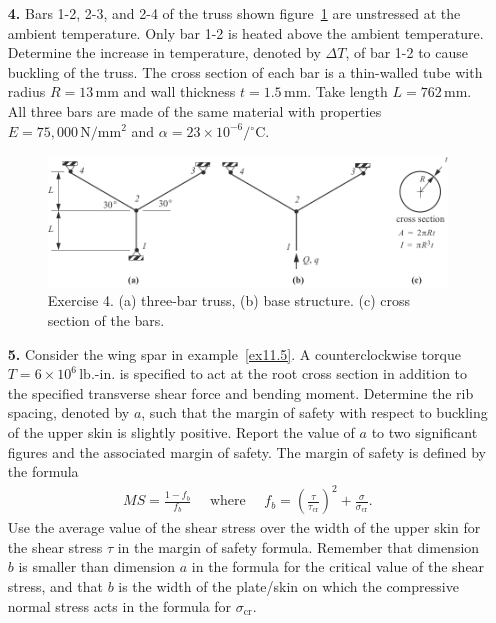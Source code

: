 \documentclass{AeroStructure-ERJohnson}
\begin{document}
\begin{exercise}
\begin{enumerate}[\textbf{2.}]
\item[\textbf{4.}] Bars 1-2, 2-3, and 2-4 of the truss shown figure~\ref{fig11.38} are unstressed at the ambient temperature. Only bar 1-2 is heated above the ambient temperature. Determine the increase in temperature, denoted by $\Delta T$, of bar 1-2 to cause buckling of the truss. The cross section of each bar is a thin-walled tube with radius $R=13\,\mathrm{mm}$ and wall thickness $t=1.5\,\mathrm{mm}$. Take length $L=762\,\mathrm{mm}$. All three bars are made of the same material with properties $E=75{,}000\,\mathrm{N}/\mathrm{mm}^{2}$ and $\alpha=23 \times 10^{-6} /{ }^{\circ}\mathrm{C}$.

\begin{figure}[!h]
\centerline{\includegraphics{Figure_11-38.pdf}}
\caption{Exercise 4. (a) three-bar truss, (b) base structure. (c) cross section of the bars.} \label{fig11.38}
\end{figure}

\item[\textbf{5.}] Consider the wing spar in example~\ref{ex11.5}. A counterclockwise torque $T=6 \times 10^{6}\,\textrm{lb.}$-$\mathrm{in}$. is specified to act at the root cross section in addition to the specified transverse shear force and bending moment. Determine the rib spacing, denoted by $a$, such that the margin of safety with respect to buckling of the upper skin is slightly positive. Report the value of $a$ to two significant figures and the associated margin of safety. The margin of safety is defined by the formula\vspace*{-6pt}
\begin{align*}
\textit{MS}=\frac{1-f_{b}}{f_{b}} \quad \text { where } \quad f_{b}=\left(\frac{\tau}{\tau_{\textrm{cr}}}\right)^{2}+\frac{\sigma}{\sigma_{\textrm{cr}}}.
\end{align*}
Use the average value of the shear stress over the width of the upper skin for the shear stress $\tau$ in the margin of safety formula. Remember that dimension $b$ is smaller than dimension $a$ in the formula for the critical value of the shear stress, and that $b$ is the width of the plate/skin on which the compressive normal stress acts in the formula for $\sigma_{\mathrm{cr}}$.
\end{enumerate}
\end{exercise}
\end{document}
